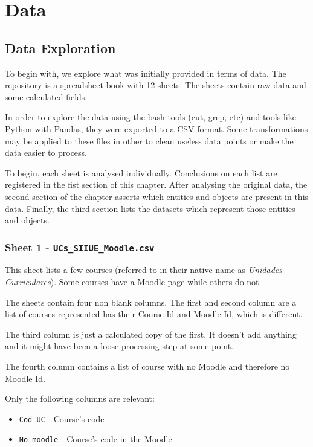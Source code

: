 \chapter{Data}

\section{Data Exploration}

To begin with, we explore what was initially provided in terms of data. The
repository is a spreadsheet book with 12 sheets. The sheets contain raw data
and some calculated fields.

In order to explore the data using the bash tools (cut, grep, etc) and tools
like Python with Pandas, they were exported to a CSV format. Some
transformations may be applied to these files in other to clean useless data
points or make the data easier to process.

To begin, each sheet is analysed individually. Conclusions on each list are
registered in the fist section of this chapter. After analysing the original
data, the second section of the chapter asserts which entities and objects are
present in this data. Finally, the third section lists the datasets which
represent those entities and objects.

\subsection{Sheet 1 - \texttt{UCs\_SIIUE\_Moodle.csv}}

This sheet lists a few courses (referred to in their native name as
\textit{Unidades Curriculares}). Some courses have a Moodle page while others
do not.

The sheets contain four non blank columns. The first and second column are a
list of courses represented has their Course Id and Moodle Id, which is
different.

The third column is just a calculated copy of the first. It doesn't add
anything and it might have been a loose processing step at some point.

The fourth column contains a list of course with no Moodle and therefore no
Moodle Id.

Only the following columns are relevant:

\begin{itemize}
    \item \texttt{Cod UC} - Course's code
    \item \texttt{No moodle} - Course's code in the Moodle
\end{itemize}

